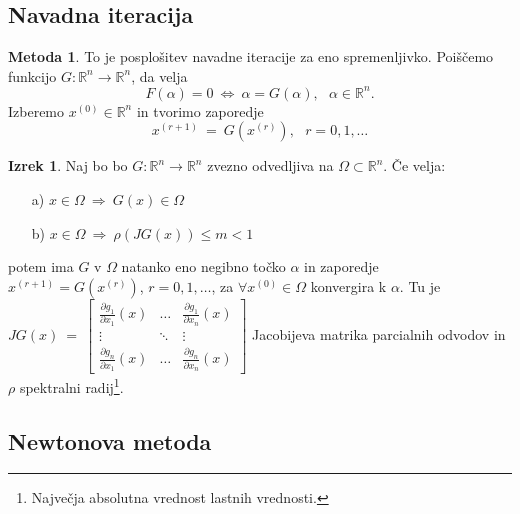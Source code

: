 \documentclass[11pt]{article}
\theoremstyle{definition}
\newtheorem{izrek}{Izrek}
\newtheorem*{metoda}{Metoda}
\begin{document}

\subsection{Navadna iteracija}
\vspace{0.5cm}

\begin{metoda}

To je posplošitev navadne iteracije za eno spremenljivko. Poiščemo funkcijo $G: \mathbb{R}^n \rightarrow \mathbb{R}^n$, da velja
$$F(\alpha) = 0 ~\iff~ \alpha = G(\alpha), ~~~\alpha \in \mathbb{R}^n.$$
Izberemo $x^{(0)} \in \mathbb{R}^n$ in tvorimo zaporedje
$$x^{(r+1)} ~=~ G(x^{(r)}), ~~~r = 0, 1, \ldots$$

\end{metoda}
\vspace{0.5cm}

\begin{izrek}

Naj bo bo $G: \mathbb{R}^n \rightarrow \mathbb{R}^n$ zvezno odvedljiva na $\Omega \subset \mathbb{R}^n$. Če velja:
\begin{enumerate}
	\item[a)] $x \in \Omega ~\Rightarrow~ G(x) \in \Omega$
	\item[b)] $x \in \Omega ~\Rightarrow~ \rho(JG(x)) \leq m < 1$
\end{enumerate}
potem ima $G$ v $\Omega$ natanko eno negibno točko $\alpha$ in zaporedje $x^{(r+1)} = G(x^{(r)})$, $r = 0, 1, \ldots$, za $\forall x^{(0)} \in \Omega$ konvergira k $\alpha$. Tu je
$JG(x) ~=~ \begin{bmatrix}
\frac{\partial g_1}{\partial x_1}(x) & \ldots & \frac{\partial g_1}{\partial x_n}(x) \\
\vdots & \ddots & \vdots \\
\frac{\partial g_n}{\partial x_1}(x) & \ldots & \frac{\partial g_n}{\partial x_n}(x)
\end{bmatrix}$
Jacobijeva matrika parcialnih odvodov in $\rho$ spektralni radij\footnote{Največja absolutna vrednost lastnih vrednosti.}.

\end{izrek}
\vspace{0.5cm}


\subsection{Newtonova metoda}
\vspace{0.5cm}
\end{document}
